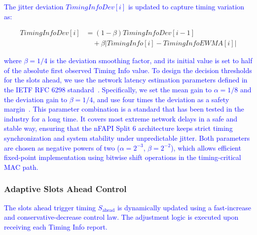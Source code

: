 \documentclass[10pt, conference, letterpaper]{IEEEtran}
\begin{document}
\textcolor{blue}{The jitter deviation $\mathit{TimingInfoDev}[i]$ is updated to capture timing variation as:}
\begin{small}
\begin{equation}
\begin{split}
\mathit{TimingInfoDev}[i] & = (1 - \beta) \mathit{TimingInfoDev}[i-1] \\
& \quad + \beta |\mathit{TimingInfo}[i] - \mathit{TimingInfoEWMA}[i]|
\end{split}
\end{equation}
\end{small}
\textcolor{blue}{where $\beta = 1/4$ is the deviation smoothing factor, and its initial value is set to half of the absolute first observed Timing Info value. To design the decision thresholds for the slots ahead, we use the network latency estimation parameters defined in the IETF RFC 6298 standard~\cite{rfc6298}. Specifically, we set the mean gain to $\alpha = 1/8$ and the deviation gain to $\beta = 1/4$, and use four times the deviation as a safety margin~\cite{rfc6298}. This parameter combination is a standard that has been tested in the industry for a long time. It covers most extreme network delays in a safe and stable way, ensuring that the nFAPI Split 6 architecture keeps strict timing synchronization and system stability under unpredictable jitter. Both parameters are chosen as negative powers of two ($\alpha = 2^{-3}$, $\beta = 2^{-2}$), which allows efficient fixed-point implementation using bitwise shift operations in the timing-critical MAC path.}\subsubsection{Adaptive Slots Ahead Control}
\label{subsubsec:delay_control}
\textcolor{blue}{The slots ahead trigger timing $S_{\mathrm{ahead}}$ is dynamically updated using a fast-increase and conservative-decrease control law. The adjustment logic is executed upon receiving each Timing Info report.}
\end{document}
